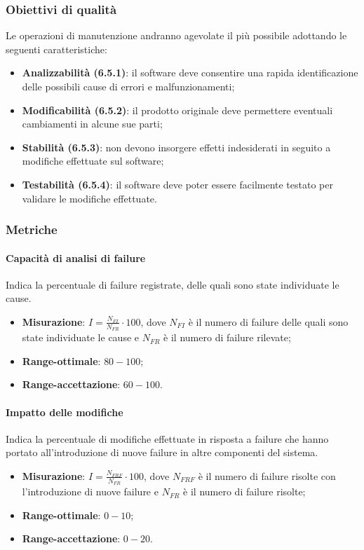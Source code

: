 \subsubsection{Obiettivi di qualità}
Le operazioni di manutenzione andranno agevolate il più possibile adottando le seguenti caratteristiche:
\begin{itemize}
\item \textbf{Analizzabilità (6.5.1)}: il software deve consentire una rapida identificazione delle possibili cause di errori e malfunzionamenti;
\item \textbf{Modificabilità (6.5.2)}: il prodotto originale deve permettere eventuali cambiamenti in alcune sue parti;
\item \textbf{Stabilità (6.5.3)}: non devono insorgere effetti indesiderati in seguito a modifiche effettuate sul software;
\item \textbf{Testabilità (6.5.4)}: il software deve poter essere facilmente testato per validare le modifiche effettuate.
\end{itemize}
\subsubsection{Metriche}
\paragraph{Capacità di analisi di failure}
Indica la percentuale di failure registrate, delle quali sono state individuate le cause.
\begin{itemize}
\item \textbf{Misurazione}: $I=\frac{N_{FI}}{N_{FR}} \cdot 100$, dove $N_{FI}$ è il numero di failure delle quali sono state individuate le cause e $N_{FR}$ è il numero di failure rilevate;
\item \textbf{Range-ottimale}: $80 - 100$;
\item \textbf{Range-accettazione}: $60 - 100$.
\end{itemize}
\paragraph{Impatto delle modifiche}
Indica la percentuale di modifiche effettuate in risposta a failure che hanno portato all'introduzione di nuove failure in altre componenti del sistema.
\begin{itemize}
\item \textbf{Misurazione}: $I=\frac{N_{FRF}}{N_{FR}} \cdot 100$, dove $N_{FRF}$ è il numero di failure risolte con l'introduzione di nuove failure e $N_{FR}$ è il numero di failure risolte;
\item \textbf{Range-ottimale}: $0 - 10$;
\item \textbf{Range-accettazione}: $0 - 20$.
\end{itemize}

